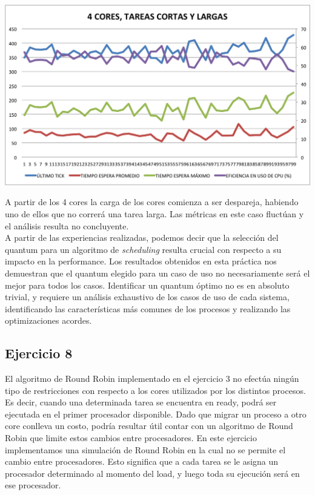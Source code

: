 \begin{center}
	\includegraphics[scale=0.4]{graficos/4cores_loteCortasLargas.png} \\
\end{center}

A partir de los 4 cores la carga de los cores comienza a ser despareja, habiendo uno de ellos que no correr\'a una tarea larga. Las m\'etricas en este caso fluct\'uan y el an\'alisis resulta no concluyente. \\

A partir de las experiencias realizadas, podemos decir que la selecci\'on del quantum para un algoritmo de \textit{scheduling} resulta crucial con respecto a su impacto en la performance. Los resultados obtenidos en esta pr\'actica nos demuestran que el quantum elegido para un caso de uso no necesariamente ser\'a el mejor para todos los casos. Identificar un quantum \'optimo no es en absoluto trivial, y requiere un an\'alisis exhaustivo de los casos de uso de cada sistema, identificando las caracter\'isticas m\'as comunes de los procesos y realizando las optimizaciones acordes.

\subsection{Ejercicio 8}

El algoritmo de Round Robin implementado en el ejercicio 3 no efectúa ningún tipo de restricciones con respecto a los cores utilizados por los distintos procesos. Es decir, cuando una determinada tarea se encuentra en ready, podrá ser ejecutada en el primer procesador disponible. Dado que migrar un proceso a otro core conlleva un costo, podría resultar útil contar con un algoritmo de Round Robin que limite estos cambios entre procesadores. En este ejercicio implementamos una simulación de Round Robin en la cual no se permite el cambio entre procesadores. Esto significa que a cada tarea se le asigna un procesador determinado al momento del load, y luego toda su ejecución será en ese procesador.\\

